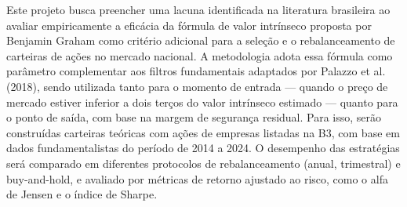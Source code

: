 \begin{meuresumo}
Este projeto busca preencher uma lacuna identificada na literatura brasileira ao avaliar empiricamente a eficácia da fórmula de valor intrínseco proposta por Benjamin Graham como critério adicional para a seleção e o rebalanceamento de carteiras de ações no mercado nacional. A metodologia adota essa fórmula como parâmetro complementar aos filtros fundamentais adaptados por Palazzo et al. (2018), sendo utilizada tanto para o momento de entrada — quando o preço de mercado estiver inferior a dois terços do valor intrínseco estimado — quanto para o ponto de saída, com base na margem de segurança residual. Para isso, serão construídas carteiras teóricas com ações de empresas listadas na B3, com base em dados fundamentalistas do período de 2014 a 2024. O desempenho das estratégias será comparado em diferentes protocolos de rebalanceamento (anual, trimestral) e  buy-and-hold, e avaliado por métricas de retorno ajustado ao risco, como o alfa de Jensen e o índice de Sharpe.
\end{meuresumo}




\makeatletter
\def\@makechapterhead#1{%
  \vspace*{50\p@}%
  {\parindent \z@ \raggedright \normalfont
    \ifnum \c@secnumdepth >\m@ne
      \huge\bfseries \thechapter\space
    \fi
    \huge \bfseries #1\par\nobreak
    \vskip 40\p@
  }}
\makeatother


